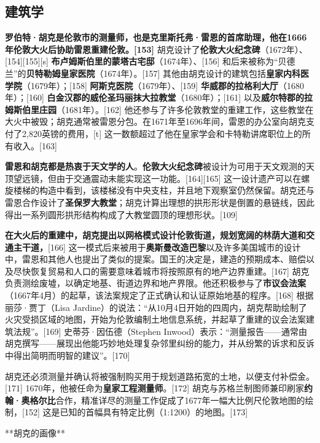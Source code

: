 \subsection{建筑学}
\textbf{罗伯特·胡克是伦敦市的测量师，也是克里斯托弗·雷恩的首席助理，他在1666年伦敦大火后协助雷恩重建伦敦。[153]} 胡克设计了\textbf{伦敦大火纪念碑}（1672年）、[154][155][s] \textbf{布卢姆斯伯里的蒙塔古宅邸}（1674年）、[156] 和后来被称为“贝德兰”的\textbf{贝特勒姆皇家医院}（1674年）。[157] 其他由胡克设计的建筑包括\textbf{皇家内科医学院}（1679年）；[158] \textbf{阿斯克医院}（1679年）、[159] \textbf{华威郡的拉格利大厅}（1680年）；[160] \textbf{白金汉郡的威伦圣玛丽抹大拉教堂}（1680年）；[161] 以及\textbf{威尔特郡的拉姆斯伯里庄园}（1681年）。[162] 他还参与了许多伦敦教堂的重建工作，这些教堂在大火中被毁；胡克通常被雷恩分包。在1671年至1696年间，雷恩的办公室向胡克支付了2,820英镑的费用，[t] 这一数额超过了他在皇家学会和卡特勒讲席职位上的所有收入。[163]  

\textbf{雷恩和胡克都是热衷于天文学的人}。\textbf{伦敦大火纪念碑}被设计为可用于天文观测的天顶望远镜，但由于交通震动未能实现这一功能。[164][165] 这一设计遗产可以在螺旋楼梯的构造中看到，该楼梯没有中央支柱，并且地下观察室仍然保留。胡克还与雷恩合作设计了\textbf{圣保罗大教堂}；胡克计算出理想的拱形形状是倒置的悬链线，因此得出一系列圆形拱形结构构成了大教堂圆顶的理想形状。[109]  

\textbf{在大火后的重建中，胡克提出以网格模式设计伦敦街道，规划宽阔的林荫大道和交通主干道，}[166] 这一模式后来被用于\textbf{奥斯曼改造巴黎}以及许多美国城市的设计中，雷恩和其他人也提出了类似的提案。国王的决定是，建造的预期成本、赔偿以及尽快恢复贸易和人口的需要意味着城市将按照原有的地产边界重建。[167] 胡克负责测绘废墟，以确定地基、街道边界和地产界限。他还积极参与了\textbf{市议会法案}（1667年4月）的起草，该法案规定了正式确认和认证原始地基的程序。[168] 根据丽莎·贾丁（Lisa Jardine）的说法：“从10月4日开始的四周内，胡克帮助绘制了火灾受损区域的地图，开始为伦敦编制土地信息系统，并起草了重建的议会法案建筑法规”。[169] 史蒂芬·因伍德（Stephen Inwood）表示：“测量报告——通常由胡克撰写——展现出他能巧妙地处理复杂邻里纠纷的能力，并从纷繁的诉求和反诉中得出简明而明智的建议”。[170]  

胡克还必须测量并确认将被强制购买用于规划道路拓宽的土地，以便支付补偿金。[171] 1670年，他被任命为\textbf{皇家工程测量师}。[172] 胡克与苏格兰制图师兼印刷家\textbf{约翰·奥格尔比}合作，精准详尽的测量工作促成了1677年一幅大比例尺伦敦地图的绘制，[152] 这是已知的首幅具有特定比例（1:1200）的地图。[173]


**胡克的画像**

